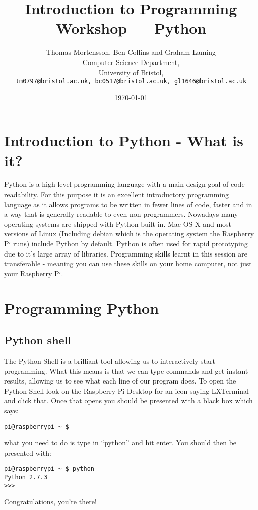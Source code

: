 \documentclass[twocolumn]{article}
\begin{document}
\lstset{style=Style1}

\title{Introduction to Programming Workshop --- Python} 
\author{Thomas Mortensson, Ben Collins and Graham Laming\\
        	Computer Science Department,\\
		University of Bristol,\\
		\texttt{\href{mailto:tm0797@bristol.ac.uk}{tm0797@bristol.ac.uk}, \href{mailto:bc0517@bristol.ac.uk}{bc0517@bristol.ac.uk}, \href{mailto:gl1646@bristol.ac.uk}{gl1646@bristol.ac.uk}} 
		}
\date{\today} 
\maketitle

\section{Introduction to Python - What is it?}

Python is a high-level programming language with a main design goal of code readability. For this purpose it is an excellent introductory programming language as it allows programs to be written in fewer lines of code, faster and in a way that is generally readable to even non programmers. Nowadays many operating systems are shipped with Python built in. Mac OS X and most versions of Linux (Including debian which is the operating system the Raspberry Pi runs) include Python by default. Python is often used for rapid prototyping due to it's large array of libraries. Programming skills learnt in this session are transferable - meaning you can use these skills on your home computer, not just your Raspberry Pi.

\section {Programming Python}



\subsection{Python shell}

The Python Shell is a brilliant tool allowing us to interactively start programming. What this means is that we can type commands and get instant results, allowing us to see what each line of our program does. To open the Python Shell look on the Raspberry Pi Desktop for an icon saying LXTerminal and click that. Once that opens you should be presented with a black box which says:
\begin{lstlisting}
pi@raspberrypi ~ $
\end{lstlisting}
what you need to do is type in ``python'' and hit enter. You should then be presented with:
\begin{lstlisting}
pi@raspberrypi ~ $ python
Python 2.7.3
>>>
\end{lstlisting}
Congratulations, you're there!
\end{document}

